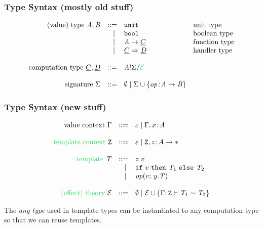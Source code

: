 \documentclass[usenames,dvipsnames]{beamer}
\begin{document}
\begin{frame}
  \frametitle{Type Syntax (mostly old stuff)}
  \[
	\begin{array}{rrll}
		\text{(value) type}~\tyA, \tyB
		 & ::=   & \unittype          & \text{unit type}\\
		 & \vsep & \booltype          & \text{boolean type}\\
		 & \vsep & \tyA \to \ctyC     & \text{function type}\\
		 & \vsep & \ctyC \hto \ctyD   & \text{handler type}\\
		\\
		\text{computation type}~\ctyC, \ctyD
		 & ::=   & \ctype{\tyA}{\sig}{\new{\eqE}}\\
		\\
		\text{signature}~\sig
		 & ::=   & \nil \vsep \sig \union \set{{\op \oftype \tyA \to \tyB}}\\
	\end{array}
\]


\end{frame}
\begin{frame}
  \frametitle{Type Syntax (new stuff)}
  \[
	\begin{array}{rrll}
		\text{value context}~\ctx
		 & ::=   & \varepsilon \vsep \ctx, x \oftype \tyA \\
		\\
		\new{ \text{template context}}~\tvars
		 & ::=   & \varepsilon \vsep \tvars, z \oftype \tyA \to \anytype \\
    \\
		\new{\text{template}}~\tmplT
		 & ::=   & \apply{z}{v} \\
		 & \vsep & \ifclause{v}{\tmplT_1}{\tmplT_2} \\
		 & \vsep & \operation{v}{y.\tmplT} \\
		\\
		\new{\text{(effect) theory}}~\eqE
		 & ::=   & \nil \vsep \eqE \union
		\set{\teqjudgement{\tenv}{\tmplT_1 \rel \tmplT_2}}\\
	\end{array}
  \]
  
  The \emph{any type} \new{$\anytype$} used in template types can be instantiated to any computation type so that we can reuse templates.
\end{frame}
\end{document}

